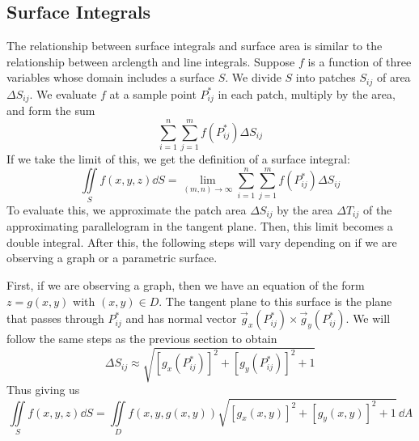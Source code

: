 \subsection{Surface Integrals}
The relationship between surface integrals and surface area is similar to the relationship between arclength and line integrals. Suppose $f$ is a function of three variables whose domain includes a surface $S$. We divide $S$ into patches $S_{ij}$ of area $\Delta S_{ij}$. We evaluate $f$ at a sample point $P^*_{ij}$ in each patch, multiply by the area, and form the sum
\[ \sum_{i=1}^n\sum_{j=1}^m f(P_{ij}^*)\Delta S_{ij}\]
If we take the limit of this, we get the definition of a surface integral:
\[ \iint\limits_S f(x,y,z)\dd S = \lim_{(m,n)\to\infty} \sum_{i=1}^n\sum_{j=1}^m f(P_{ij}^*)\Delta S_{ij}\]
To evaluate this, we approximate the patch area $\Delta S_{ij}$ by the area $\Delta T_{ij}$ of the approximating parallelogram in the tangent plane. Then, this limit becomes a double integral. After this, the following steps will vary depending on if we are observing a graph or a parametric surface. \par
First, if we are observing a graph, then we have an equation of the form $z=g(x,y)$ with $(x,y)\in D$. The tangent plane to this surface is the plane that passes through $P^*_{ij}$ and has normal vector $\vec g_x(P_{ij}^*)\times \vec g_y(P_{ij}^*)$. We will follow the same steps as the previous section to obtain 
\[ \Delta S_{ij} \approx \sqrt{\left[g_x(P_{ij}^*)\right]^2 + \left[g_y(P_{ij}^*)\right]^2+1}\]
Thus giving us
\[ \iint\limits_S f(x,y,z)\dd S = \iint\limits_D f(x,y,g(x,y))\sqrt{[g_x(x,y)]^2+[g_y(x,y)]^2+1}\,\dd A\]


